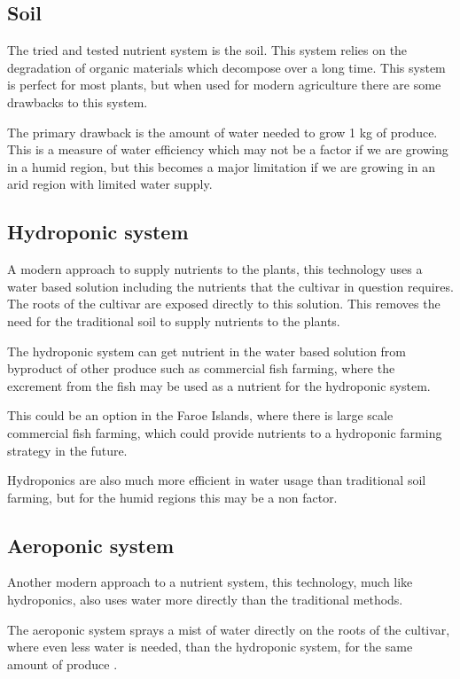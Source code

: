 \documentclass[a4paper,12pt,twoside,openright,titlepage]{book}
\begin{document}
\subsection{Soil}
The tried and tested nutrient system is the soil. This system relies on the degradation of organic materials which decompose over a long time. This system is perfect for most plants, but when used for modern agriculture there are some drawbacks to this system.

The primary drawback is the amount of water needed to grow 1 kg of produce. This is a measure of water efficiency which may not be a factor if we are growing in a humid region, but this becomes a major limitation if we are growing in an arid region with limited water supply.

\subsection{Hydroponic system}
A modern approach to supply nutrients to the plants, this technology uses a water based solution including the nutrients that the cultivar in question requires.
The roots of the cultivar are exposed directly to this solution.
This removes the need for the traditional soil to supply nutrients to the plants.

The hydroponic system can get nutrient in the water based solution from byproduct of other produce such as commercial fish farming, where the excrement from the fish may be used as a nutrient for the hydroponic system.

This could be an option in the Faroe Islands, where there is large scale commercial fish farming, which could provide nutrients to a hydroponic farming strategy in the future.

Hydroponics are also much more efficient in water usage than traditional soil farming, but for the humid regions this may be a non factor.

\subsection{Aeroponic system}
Another modern approach to a nutrient system, this technology, much like hydroponics, also uses water more directly than the traditional methods.

The aeroponic system sprays a mist of water directly on the roots of the cultivar, where even less water is needed, than the hydroponic system, for the same amount of produce \cite{aeroponic2}.
\end{document}
